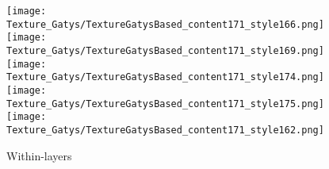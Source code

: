 \documentclass[runningheads]{llncs}
\begin{document}
\begin{figure*}[!htbp]
\begin{subfigure}[t]{0.15\textwidth}
	\texttt{[image: Texture\_Gatys/TextureGatysBased\_content171\_style166.png]}
	\texttt{[image: Texture\_Gatys/TextureGatysBased\_content171\_style169.png]}
	\texttt{[image: Texture\_Gatys/TextureGatysBased\_content171\_style174.png]}
	\texttt{[image: Texture\_Gatys/TextureGatysBased\_content171\_style175.png]}  
    \texttt{[image: Texture\_Gatys/TextureGatysBased\_content171\_style162.png]}
    \caption{Within-layers}
\end{subfigure}
\begin{subfigure}[t]{0.15\textwidth}
	

\end{subfigure}
\end{figure*}
\end{document}
